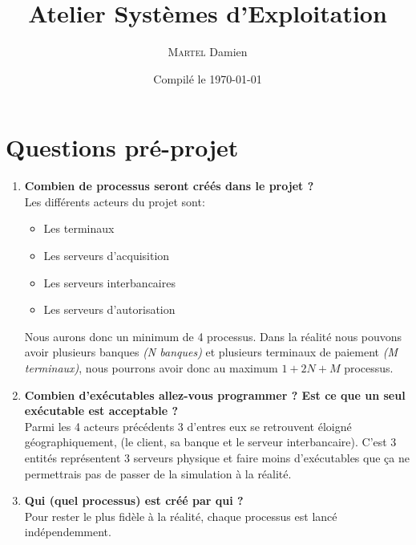 \documentclass[french, a4paper, 12pt, titlepage]{article}
\begin{document}
\title{Atelier Systèmes d'Exploitation}
\author{\textsc{Martel} Damien}
\date{Compilé le \today}

\maketitle

\vfill
\pagebreak

\newpage
\strut\thispagestyle{empty}
\vfill
\pagebreak
\tableofcontents
\strut\thispagestyle{empty}
\newpage
\setcounter{page}{1}

\section{Questions pré-projet}
\begin{enumerate}
\item \textbf{Combien de processus seront créés dans le projet ?}\\
Les différents acteurs du projet sont: \begin{itemize}
\item Les terminaux
\item Les serveurs d'acquisition
\item Les serveurs interbancaires
\item Les serveurs d'autorisation
\end{itemize}
Nous aurons donc un minimum de 4 processus.
Dans la réalité nous pouvons avoir plusieurs banques \textit{(N banques)} et plusieurs terminaux de paiement \textit{(M terminaux)}, nous pourrons avoir donc au maximum $1+2N+M$ processus.\\

\item \textbf{Combien d'exécutables allez-vous programmer ? Est ce que un seul exécutable est acceptable ?}\\
Parmi les 4 acteurs précédents 3 d'entres eux se retrouvent éloigné géographiquement, (le client, sa banque et le serveur interbancaire).
C'est 3 entités représentent 3 serveurs physique et faire moins d'exécutables que ça ne permettrais pas de passer de la simulation à la réalité.\\

\item \textbf{Qui (quel processus) est créé par qui ?}\\
Pour rester le plus fidèle à la réalité, chaque processus est lancé indépendemment.\\


\end{enumerate}
\end{document}
